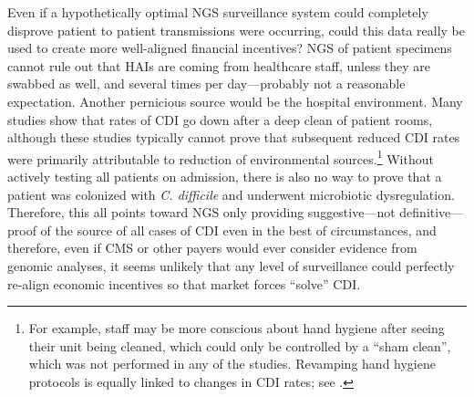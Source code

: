 Even if a hypothetically optimal NGS surveillance system could completely disprove patient to patient transmissions were occurring, could this data really be used to create more well-aligned financial incentives? NGS of patient specimens cannot rule out that HAIs are coming from healthcare staff, unless they are swabbed as well, and several times per day—probably not a reasonable expectation. Another pernicious source would be the hospital environment. Many studies show that rates of CDI go down after a deep clean of patient rooms,\autocite{Best2014,Hughes2013,Khanafer2015} although these studies typically cannot prove that subsequent reduced CDI rates were primarily attributable to reduction of environmental sources.\footnote{For example, staff may be more conscious about hand hygiene after seeing their unit being cleaned, which could only be controlled by a ``sham clean'', which was not performed in any of the studies. Revamping hand hygiene protocols is equally linked to changes in CDI rates; see \textcite{Khanafer2015}.} Without actively testing all patients on admission, there is also no way to prove that a patient was colonized with \emph{C. difficile} and underwent microbiotic dysregulation. Therefore, this all points toward NGS only providing suggestive—not definitive—proof of the source of all cases of CDI even in the best of circumstances, and therefore, even if CMS or other payers would ever consider evidence from genomic analyses, it seems unlikely that any level of surveillance could perfectly re-align economic incentives so that market forces ``solve'' CDI.

